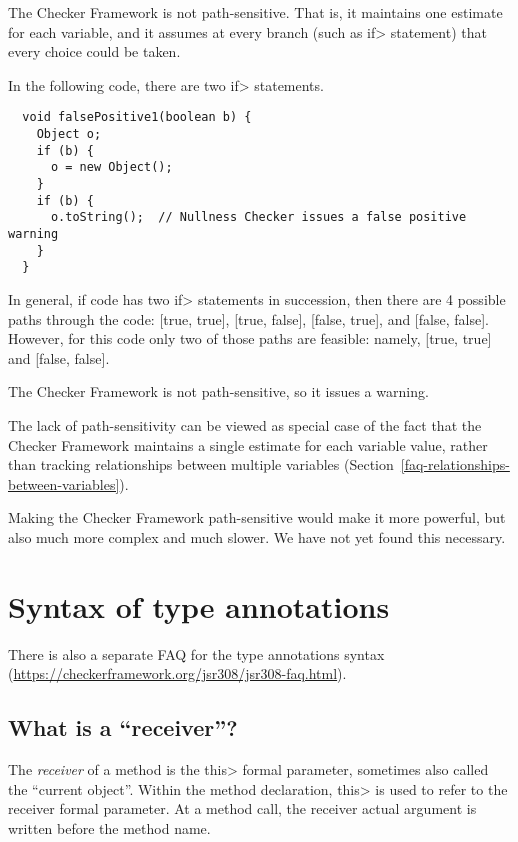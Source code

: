 The Checker Framework is not path-sensitive.  That is, it maintains one
estimate for each variable, and it assumes at every branch (such as \<if>
statement) that every choice could be taken.

In the following code, there are two \<if> statements.

\begin{Verbatim}
  void falsePositive1(boolean b) {
    Object o;
    if (b) {
      o = new Object();
    }
    if (b) {
      o.toString();  // Nullness Checker issues a false positive warning
    }
  }
\end{Verbatim}

In general, if code has two \<if> statements in succession, then there are
4 possible paths through the code:  [true, true], [true, false], [false,
  true], and [false, false].  However, for this code only two of those
paths are feasible:  namely, [true, true] and [false, false].

The Checker Framework is not path-sensitive, so it issues a warning.

The lack of path-sensitivity can be viewed as special case of the fact that
the Checker Framework maintains a single estimate for each variable value,
rather than tracking relationships between multiple variables
(Section~\ref{faq-relationships-between-variables}).

Making the Checker Framework path-sensitive would make it more powerful,
but also much more complex and much slower.  We have not yet found this
necessary.


\section{Syntax of type annotations\label{faq-syntax-section}}

There is also a separate FAQ for the type annotations syntax
(\url{https://checkerframework.org/jsr308/jsr308-faq.html}).


\subsection{What is a ``receiver''?\label{faq-receiver}}

The \emph{receiver} of a method is the \<this> formal parameter, sometimes
also called the ``current object''.  Within the method declaration, \<this>
is used to refer to the receiver formal parameter.  At a method call, the
receiver actual argument is written before the method name.

